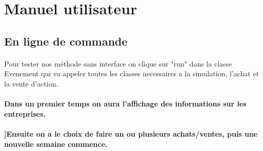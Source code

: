 \newpage
\section{Manuel utilisateur}
\label{sec:manuel}


\subsection{En ligne de commande}
\paragraph{} Pour tester nos méthode sans interface on clique sur "run" dans la classe Evenement qui va appeler toutes les classes necessaires a la simulation, l'achat et la vente d'action.
\paragraph{Dans un premier temps on aura l'affichage des informations sur les entreprises.}



\paragraph{]Ensuite on a le choix de faire un ou plusieurs achats/ventes, puis une nouvelle semaine commence.}



\paragraph{}
\paragraph{}
\paragraph{}
